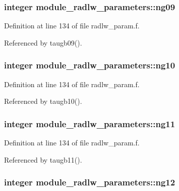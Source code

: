 \subsubsection[{\texorpdfstring{ng09}{ng09}}]{\setlength{\rightskip}{0pt plus 5cm}integer module\+\_\+radlw\+\_\+parameters\+::ng09}\hypertarget{group__module__radlw__main_ga2856b7576a44f2e35bd0fbc1e49bd270}{}\label{group__module__radlw__main_ga2856b7576a44f2e35bd0fbc1e49bd270}


Definition at line 134 of file radlw\+\_\+param.\+f.



Referenced by taugb09().

\subsubsection[{\texorpdfstring{ng10}{ng10}}]{\setlength{\rightskip}{0pt plus 5cm}integer module\+\_\+radlw\+\_\+parameters\+::ng10}\hypertarget{group__module__radlw__main_gaa764831e931a2ec27c763ebf957bbc67}{}\label{group__module__radlw__main_gaa764831e931a2ec27c763ebf957bbc67}


Definition at line 134 of file radlw\+\_\+param.\+f.



Referenced by taugb10().

\subsubsection[{\texorpdfstring{ng11}{ng11}}]{\setlength{\rightskip}{0pt plus 5cm}integer module\+\_\+radlw\+\_\+parameters\+::ng11}\hypertarget{group__module__radlw__main_ga239b6c64459896a583e88c8ba2324348}{}\label{group__module__radlw__main_ga239b6c64459896a583e88c8ba2324348}


Definition at line 134 of file radlw\+\_\+param.\+f.



Referenced by taugb11().

\subsubsection[{\texorpdfstring{ng12}{ng12}}]{\setlength{\rightskip}{0pt plus 5cm}integer module\+\_\+radlw\+\_\+parameters\+::ng12}\hypertarget{group__module__radlw__main_ga88f3b780d4dc9d4e45852fd41e111a21}{}\label{group__module__radlw__main_ga88f3b780d4dc9d4e45852fd41e111a21}


